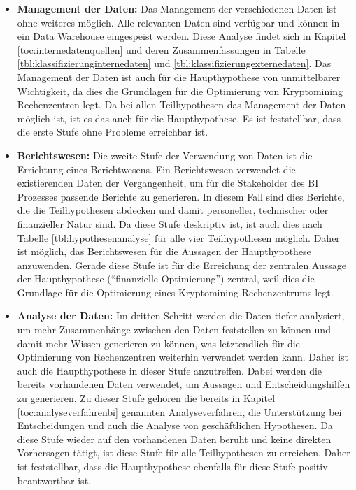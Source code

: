 \begin{itemize}
    \item \textbf{Management der Daten: }Das Management der verschiedenen Daten ist ohne weiteres möglich. Alle relevanten
    Daten sind verfügbar und können in ein Data Warehouse eingespeist werden. Diese Analyse findet sich in Kapitel
    \ref{toc:internedatenquellen} und deren Zusammenfassungen in Tabelle \ref{tbl:klassifizierunginternedaten} und
    \ref{tbl:klassifizierungexternedaten}. Das Management der Daten ist auch für die Haupthypothese von unmittelbarer
    Wichtigkeit, da dies die Grundlagen für die Optimierung von Kryptomining Rechenzentren legt. Da bei allen Teilhypothesen
    das Management der Daten möglich ist, ist es das auch für die Haupthypothese. Es ist feststellbar, dass die erste
    Stufe ohne Probleme erreichbar ist.
    \item \textbf{Berichtswesen: }Die zweite Stufe der Verwendung von Daten ist die Errichtung eines Berichtwesens. Ein Berichtswesen
    verwendet die existierenden Daten der Vergangenheit, um für die Stakeholder des \ac{BI} Prozesses passende Berichte zu generieren.
    In diesem Fall sind dies Berichte, die die Teilhypothesen abdecken und damit personeller, technischer oder finanzieller
    Natur sind. Da diese
    Stufe deskriptiv ist, ist auch dies nach Tabelle \ref{tbl:hypothesenanalyse} für alle vier Teilhypothesen
    möglich. Daher ist möglich, das Berichtswesen für die Aussagen der Haupthypothese anzuwenden. Gerade diese Stufe ist für
    die Erreichung der zentralen Aussage der Haupthypothese ("`finanzielle Optimierung"') zentral, weil dies die Grundlage
    für die Optimierung eines Kryptomining Rechenzentrums legt.
    \item \textbf{Analyse der Daten: }Im dritten Schritt werden die Daten tiefer analysiert, um mehr Zusammenhänge zwischen den
    Daten feststellen zu können und damit mehr Wissen generieren zu können, was letztendlich für die Optimierung von Rechenzentren
    weiterhin verwendet werden kann. Daher ist auch die Haupthypothese in dieser Stufe anzutreffen. Dabei werden die bereits
    vorhandenen Daten verwendet, um Aussagen und Entscheidungshilfen zu generieren. Zu dieser Stufe gehören die
    bereits in Kapitel \ref{toc:analyseverfahrenbi} genannten Analyseverfahren, die Unterstützung bei Entscheidungen und auch
    die Analyse von geschäftlichen Hypothesen.
    Da diese Stufe wieder auf den vorhandenen Daten beruht und keine direkten Vorhersagen tätigt, ist diese
    Stufe für alle Teilhypothesen zu erreichen. Daher ist feststellbar, dass die Haupthypothese ebenfalls für diese Stufe positiv beantwortbar ist.

\end{itemize}

